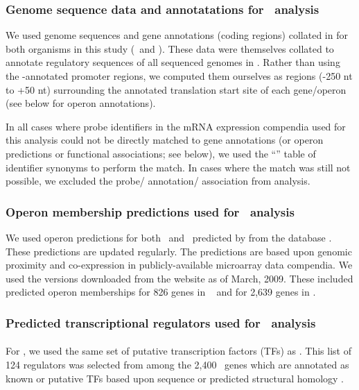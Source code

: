 \subsubsection{Genome sequence data and annotatations for \cm~analysis}

We used genome sequences and gene annotations (coding regions)
collated in  \cite{vanHelden2000} for both
organisms in this study (\halo~and \eco). These data were themselves
collated to annotate regulatory sequences of all sequenced genomes in
. Rather than using the -annotated
promoter regions, we computed them ourselves as regions (-250 nt to
+50 nt) surrounding the annotated translation start site of each
gene/operon (see below for operon annotations). 

In all cases where probe identifiers in the mRNA expression compendia
used for this analysis could not be directly matched to gene
annotations (or operon predictions or functional associations; see
below), we used the  ``''
table of identifier synonyms to perform the match. In cases where the
match was still not possible, we excluded the probe/ annotation/
association from analysis.

\subsubsection{Operon membership predictions used for \cm~analysis}

We used operon predictions for both \halo~and \eco~predicted by
\cite{Price2005a} from the 
database \cite{Alm2005}. These predictions are updated regularly. The predictions are based upon
genomic proximity and co-expression in publicly-available microarray
data compendia. We used the versions downloaded
from the website as of March, 2009. These included
predicted operon memberships for 826 genes in \halo~ and for 2,639
genes in \eco.

\subsubsection{Predicted transcriptional regulators used for \nwinf~analysis}

\paragraph{\halo}

For \halo, we used the same set of putative transcription factors
(TFs) as \cite{Bonneau2006,Bonneau2007}. This list of 124
regulators was selected from among the 2,400 \halo\ genes which are
annotated as known or putative TFs based upon sequence or predicted
structural homology \cite{Bonneau2004}.

